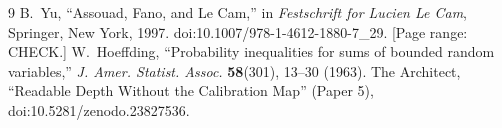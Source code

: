 \documentclass[10pt,a4paper]{article}
\theoremstyle{definition}
\theoremstyle{remark}
\begin{document}
\begin{thebibliography}{9}
 B.~Yu, ``Assouad, Fano, and Le Cam,'' in \emph{Festschrift for Lucien Le Cam}, Springer, New York,
  1997. doi:10.1007/978-1-4612-1880-7\_29. [Page range: CHECK.]
 W.~Hoeffding, ``Probability inequalities for sums of bounded random variables,''
  \emph{J. Amer. Statist. Assoc.} \textbf{58}(301), 13--30 (1963).
 The Architect, ``Readable Depth Without the Calibration Map'' (Paper 5),
  doi:10.5281/zenodo.23827536.
\end{thebibliography}
\end{document}
